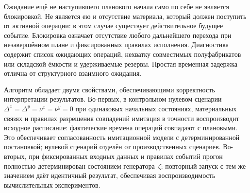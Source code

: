 \begin{center}
\label{alg:simulation_run}
\end{center}

Ожидание ещё не наступившего планового начала само по себе не является блокировкой. Не является ею и отсутствие материала, который должен поступить от активной операции: в этом случае существует действительное будущее событие. Блокировка означает отсутствие любого дальнейшего перехода при незавершённом плане и фиксированных правилах исполнения. Диагностика содержит список ожидающих операций, нехватку совместимых полуфабрикатов или складской ёмкости и удерживаемые резервы. Простая временная задержка отлична от структурного взаимного ожидания.

Алгоритм обладает двумя свойствами, обеспечивающими корректность интерпретации результатов. Во-первых, в контрольном нулевом сценарии $\Delta^x=\Delta^y=\nu^x=\nu^y=0$ при одинаковых начальных состояниях, материальных связях и правилах разрешения совпадений имитация в точности воспроизводит исходное расписание: фактические времена операций совпадают с плановыми. Это обеспечивает согласованность имитационной модели с детерминированной постановкой; нулевой сценарий отделён от производственных сценариев. Во-вторых, при фиксированных входных данных и правилах событий прогон полностью детерминирован состоянием генератора~$\zeta$: повторный запуск с тем же значением даёт идентичный результат, обеспечивая воспроизводимость вычислительных экспериментов.

